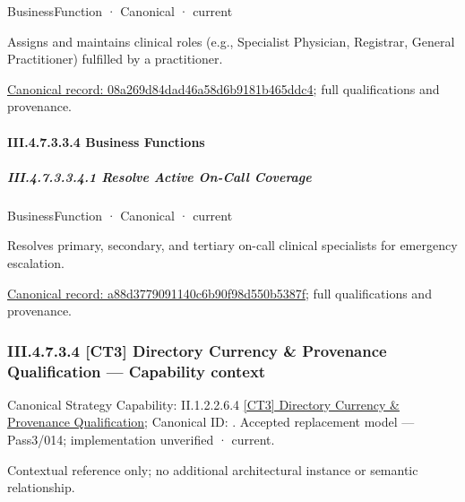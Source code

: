 \label{element:08a269d84dad46a58d6b9181b465ddc4}
{\small BusinessFunction · Canonical · current}\par

Assigns and maintains clinical roles (e.g., Specialist Physician, Registrar, General Practitioner) fulfilled by a practitioner.


{\footnotesize \href{../../../../../../../continuum/business/business-function/08a269d84dad46a58d6b9181b465ddc4.md}{Canonical record: 08a269d84dad46a58d6b9181b465ddc4}; full qualifications and provenance.}\par
\paragraph*{III.4.7.3.3.4 Business Functions}
\label{navigation:III.4.7.3.3.4}

\subparagraph*{III.4.7.3.3.4.1 Resolve Active On-Call Coverage}
\label{navigation:III.4.7.3.3.4.1}

\label{element:a88d3779091140c6b90f98d550b5387f}
{\small BusinessFunction · Canonical · current}\par

Resolves primary, secondary, and tertiary on-call clinical specialists for emergency escalation.


{\footnotesize \href{../../../../../../../continuum/business/business-function/a88d3779091140c6b90f98d550b5387f.md}{Canonical record: a88d3779091140c6b90f98d550b5387f}; full qualifications and provenance.}\par
\subsubsection*{III.4.7.3.4 [CT3] Directory Currency \& Provenance Qualification — Capability context}
\label{navigation:III.4.7.3.4}

{\small Canonical Strategy Capability: II.1.2.2.6.4 \hyperref[element:21e0c3d5b39b4d6c9c082241150f1f09]{[CT3] Directory Currency \& Provenance Qualification}; Canonical ID: \texttt{}. Accepted replacement model — Pass3/014; implementation unverified · current.}\par
Contextual reference only; no additional architectural instance or semantic relationship.\par
